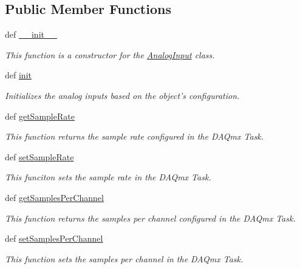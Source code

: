 \subsection*{Public Member Functions}
\begin{DoxyCompactItemize}
\item 
def \hyperlink{class_chassis_8git_1_1_analog_input_1_1_analog_input_aebf8df8ed0c363ea04afb7529ed2d4ff}{\-\_\-\-\_\-init\-\_\-\-\_\-}
\begin{DoxyCompactList}\small\item\em This function is a constructor for the \hyperlink{class_chassis_8git_1_1_analog_input_1_1_analog_input}{Analog\-Input} class. \end{DoxyCompactList}\item 
def \hyperlink{class_chassis_8git_1_1_analog_input_1_1_analog_input_aad652a0c88a6f959a8d83fafda9ae7db}{init}
\begin{DoxyCompactList}\small\item\em Initializes the analog inputs based on the object's configuration. \end{DoxyCompactList}\item 
def \hyperlink{class_chassis_8git_1_1_analog_input_1_1_analog_input_a43e4039d06268d400c247a6072aedf2d}{get\-Sample\-Rate}
\begin{DoxyCompactList}\small\item\em This function returns the sample rate configured in the D\-A\-Qmx Task. \end{DoxyCompactList}\item 
def \hyperlink{class_chassis_8git_1_1_analog_input_1_1_analog_input_ad30e424927b40e03bd423e0ba5cf7351}{set\-Sample\-Rate}
\begin{DoxyCompactList}\small\item\em This funciton sets the sample rate in the D\-A\-Qmx Task. \end{DoxyCompactList}\item 
def \hyperlink{class_chassis_8git_1_1_analog_input_1_1_analog_input_a2fc26a83c3c212ce6710967957326d3b}{get\-Samples\-Per\-Channel}
\begin{DoxyCompactList}\small\item\em This function returns the samples per channel configured in the D\-A\-Qmx Task. \end{DoxyCompactList}\item 
def \hyperlink{class_chassis_8git_1_1_analog_input_1_1_analog_input_aaef7ff9115abe6745708029a9816eb93}{set\-Samples\-Per\-Channel}
\begin{DoxyCompactList}\small\item\em This function sets the samples per channel in the D\-A\-Qmx Task. \end{DoxyCompactList}\item 

\end{DoxyCompactItemize}
